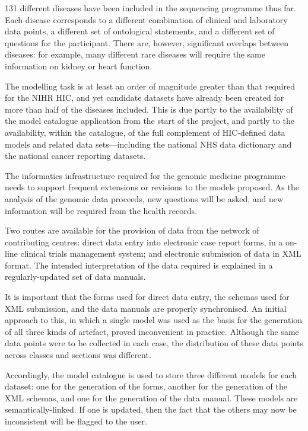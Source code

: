 131 different diseases have been included in the sequencing programme
thus far.  Each disease corresponds to a different combination of
clinical and laboratory data points, a different set of ontological
statements, and a different set of questions for the participant.
There are, however, significant overlaps between diseases: for
example, many different rare diseases will require the same
information on kidney or heart function.   

The modelling task is at least an order of magnitude greater than that
required for the NIHR HIC, and yet candidate datasets have already
been created for more than half of the diseases included.  This is due
partly to the availability of the model catalogue application from the
start of the project, and partly to the availability, within the
catalogue, of the full complement of HIC-defined data models and
related data sets---including the national NHS data dictionary and the
national cancer reporting datasets.

The informatics infrastructure required for the genomic medicine
programme needs to support frequent extensions or revisions to the
models proposed.  As the analysis of the genomic data proceeds, new
questions will be asked, and new information will be required from the
health records.  

Two routes are available for the provision of data from the network of
contributing centres: direct data entry into electronic case report
forms, in a on-line clinical trials management system; and electronic
submission of data in XML format.  The intended interpretation of the
data required is explained in a regularly-updated set of data
manuals.   

It is important that the forms used for direct data entry, the schemas
used for XML submission, and the data manuals are properly
synchronised.  An initial approach to this, in which a single model
was used as the basis for the generation of all three kinds of
artefact, proved inconvenient in practice.  Although the same data
points were to be collected in each case, the distribution of these
data points across classes and sections was different.

Accordingly, the model catalogue is used to store three different
models for each dataset: one for the generation of the forms, another
for the generation of the XML schemas, and one for the generation of
the data manual.  These models are semantically-linked.  If one is
updated, then the fact that the others may now be inconsistent will be
flagged to the user.  

